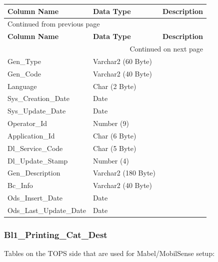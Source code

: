 \documentclass[12pt,twoside]{article}
\begin{document}
\begin{longtable}{l|l|l}
\hline
\textbf{Column Name} & \textbf{Data Type} & \textbf{Description}\\
\hline
\endfirsthead
\multicolumn{3}{l}{Continued from previous page} \\
\hline

\textbf{Column Name} & \textbf{Data Type} & \textbf{Description} \\

\hline
\endhead
\hline\multicolumn{3}{r}{Continued on next page} \\
\endfoot
\endlastfoot
\hline
Gen\_Type & Varchar2 (60 Byte) & \\
Gen\_Code & Varchar2 (40 Byte) & \\
Language & Char (2 Byte) & \\
Sys\_Creation\_Date & Date & \\
Sys\_Update\_Date & Date & \\
Operator\_Id & Number (9) & \\
Application\_Id & Char (6 Byte) & \\
Dl\_Service\_Code & Char (5 Byte) & \\
Dl\_Update\_Stamp & Number (4) & \\
Gen\_Description & Varchar2 (180 Byte) & \\
Bc\_Info & Varchar2 (40 Byte) & \\
Ods\_Insert\_Date & Date & \\
Ods\_Last\_Update\_Date & Date & \\
\hline
\end{longtable}
\normalsize

\subsubsection{Bl1\_Printing\_Cat\_Dest}
\label{sec:orgheadline143}
Tables on the TOPS side that are used for Mabel/MobilSense setup:
\footnotesize
\end{document}
